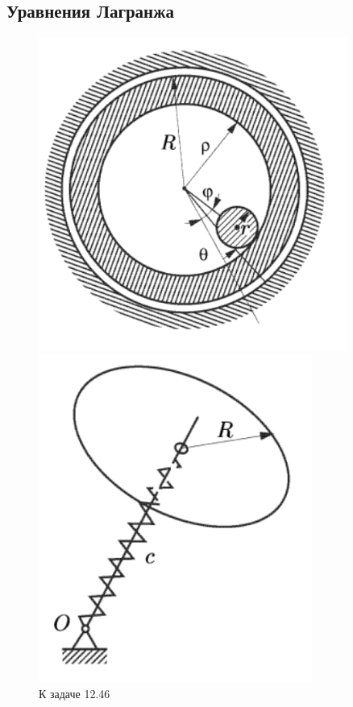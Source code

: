 \subsection{Уравнения Лагранжа}

\begin{figure}
\begin{minipage}[t]{0.3\textwidth}
    \centering
    \includegraphics[width=0.9\textwidth]{figures/12.46.png}
    \caption{К задаче 12.46}
    \label{t12n46}
\end{minipage}
\hfill
\begin{minipage}[t]{0.3\textwidth}
    \centering
    \includegraphics[width=0.8\textwidth]{figures/12.59.png}

\end{minipage}
\end{figure}
